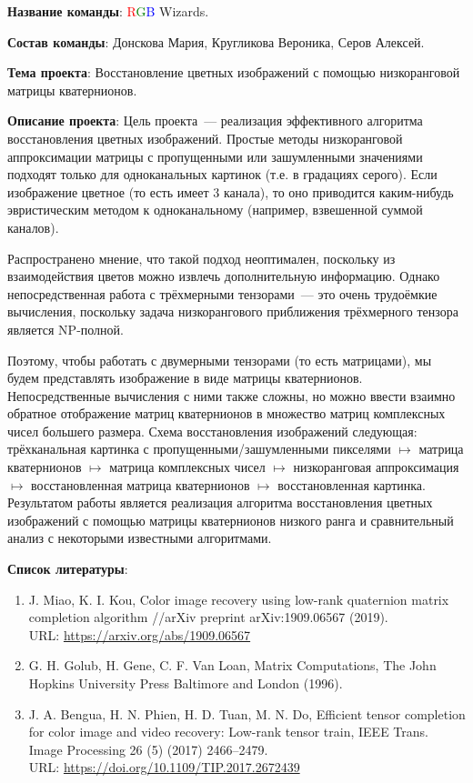 \documentclass[12pt]{article}
\begin{document}
\textbf{Название команды}:
\textcolor{red}{R}\textcolor{green}{G}\textcolor{blue}{B} Wizards.
\vspace{5mm}


\textbf{Состав команды}:
Донскова Мария, Кругликова Вероника, Серов Алексей.
\vspace{5mm}


\textbf{Тема проекта}:
Восстановление цветных изображений с помощью низкоранговой матрицы кватернионов.
\vspace{5mm}


\textbf{Описание проекта}:
Цель проекта~--- реализация эффективного алгоритма восстановления цветных изображений.
Простые методы низкоранговой аппроксимации матрицы с пропущенными или зашумленными значениями подходят только для одноканальных картинок (т.е. в градациях серого).
Если изображение цветное (то есть имеет 3 канала), то оно приводится каким-нибудь эвристическим методом к одноканальному (например, взвешенной суммой каналов).

Распространено мнение, что такой подход неоптимален, поскольку из взаимодействия цветов можно извлечь дополнительную информацию.
Однако непосредственная работа с трёхмерными тензорами~--- это очень трудоёмкие вычисления, поскольку задача низкорангового приближения трёхмерного тензора является NP-полной.

Поэтому, чтобы работать с двумерными тензорами (то есть матрицами), мы будем представлять изображение в виде матрицы кватернионов.
Непосредственные вычисления с ними также сложны, но можно ввести взаимно обратное отображение матриц кватернионов в множество матриц комплексных чисел большего размера.
Схема восстановления изображений следующая: трёхканальная картинка с пропущенными/зашумленными пикселями $\mapsto$ матрица кватернионов $\mapsto$ матрица комплексных чисел $\mapsto$ низкоранговая аппроксимация $\mapsto$ восстановленная матрица кватернионов $\mapsto$ восстановленная картинка.
Результатом работы является реализация алгоритма восстановления цветных изображений с помощью матрицы кватернионов низкого ранга и сравнительный анализ с некоторыми известными алгоритмами.
\vspace{5mm}


\textbf{Список литературы}:
\begin{enumerate}[label=\arabic*)]
    \item
	J. Miao, K. I. Kou, Color image recovery using low-rank quaternion matrix completion algorithm //arXiv preprint arXiv:1909.06567 (2019).\\
	URL: \href{https://arxiv.org/abs/1909.06567}{https://arxiv.org/abs/1909.06567}

    \item
	G. H. Golub, H. Gene, C. F. Van Loan, Matrix Computations, The John Hopkins University Press Baltimore and London (1996).

    \item
	J. A. Bengua, H. N. Phien, H. D. Tuan, M. N. Do, Efficient tensor completion for color image and video recovery: Low-rank tensor train, IEEE Trans. Image Processing 26 (5) (2017) 2466–2479. \\
	URL: \href{https://doi.org/10.1109/TIP.2017.2672439}{https://doi.org/10.1109/TIP.2017.2672439}
\end{enumerate}
\end{document}
